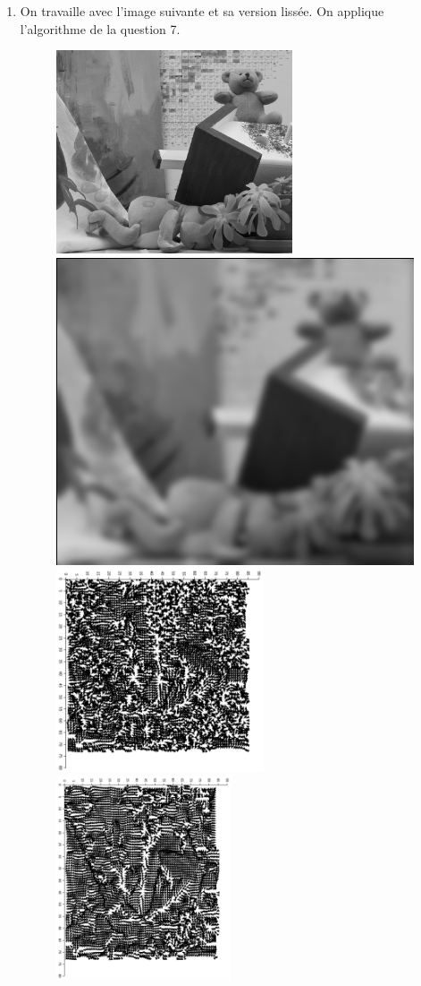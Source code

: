 \begin{enumerate}[questions, start=13]
\item On travaille avec l'image suivante et sa version lissée. On applique l'algorithme de la question 7. 
\begin{figure}[!h]
\centering
\includegraphics[width=.45\textwidth, height=6cm]{img/teddy-noblur} \hfill
\includegraphics[width=.45\textwidth]{img/teddy-blur-4}\\
\bigskip
\includegraphics[width=.45\textwidth, height=6cm]{img/q13-result-1} \hfill
\includegraphics[width=.45\textwidth, height=6cm]{img/q13-result-2}
\end{figure}


\end{enumerate}
